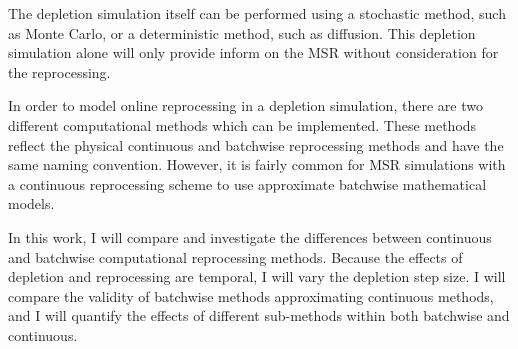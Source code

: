 The depletion simulation itself can be performed using a stochastic method, such as Monte Carlo, or a deterministic method, such as diffusion. This depletion simulation alone will only provide inform on the MSR without consideration for the reprocessing.



In order to model online reprocessing in a depletion simulation, there are two different computational methods which can be implemented. These methods reflect the physical continuous and batchwise reprocessing methods and have the same naming convention. However, it is fairly common for MSR simulations with a continuous reprocessing scheme to use approximate batchwise mathematical models.

In this work, I will compare and investigate the differences between continuous and batchwise computational reprocessing methods.
Because the effects of depletion and reprocessing are temporal, I will vary the depletion step size.
I will compare the validity of batchwise methods approximating continuous methods, and I will quantify the effects of different sub-methods within both batchwise and continuous.

